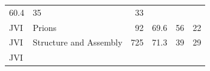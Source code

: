 \documentclass[11pt,]{article}
\begin{document}
\begin{longtable}[]{@{}llrrrr@{}}
\begin{minipage}[t]{0.08\columnwidth}
60.4\strut
\end{minipage} & \begin{minipage}[t]{0.11\columnwidth}\raggedleft\strut
35\strut
\end{minipage} & \begin{minipage}[t]{0.11\columnwidth}\raggedleft\strut
33\strut
\end{minipage}\tabularnewline
\begin{minipage}[t]{0.06\columnwidth}\raggedright\strut
JVI\strut
\end{minipage} & \begin{minipage}[t]{0.43\columnwidth}\raggedright\strut
Prions\strut
\end{minipage} & \begin{minipage}[t]{0.04\columnwidth}\raggedleft\strut
92\strut
\end{minipage} & \begin{minipage}[t]{0.08\columnwidth}\raggedleft\strut
69.6\strut
\end{minipage} & \begin{minipage}[t]{0.11\columnwidth}\raggedleft\strut
56\strut
\end{minipage} & \begin{minipage}[t]{0.11\columnwidth}\raggedleft\strut
22\strut
\end{minipage}\tabularnewline
\begin{minipage}[t]{0.06\columnwidth}\raggedright\strut
JVI\strut
\end{minipage} & \begin{minipage}[t]{0.43\columnwidth}\raggedright\strut
Structure and Assembly\strut
\end{minipage} & \begin{minipage}[t]{0.04\columnwidth}\raggedleft\strut
725\strut
\end{minipage} & \begin{minipage}[t]{0.08\columnwidth}\raggedleft\strut
71.3\strut
\end{minipage} & \begin{minipage}[t]{0.11\columnwidth}\raggedleft\strut
39\strut
\end{minipage} & \begin{minipage}[t]{0.11\columnwidth}\raggedleft\strut
29\strut
\end{minipage}\tabularnewline
\begin{minipage}[t]{0.06\columnwidth}\raggedright\strut
JVI\strut
\end{minipage} & \begin{minipage}[t]{0.43\columnwidth}\raggedright\strut

\end{minipage}
\end{longtable}
\end{document}
